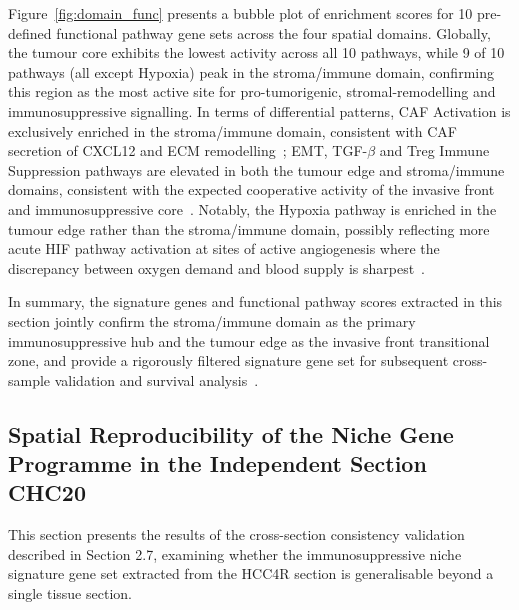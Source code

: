 \documentclass[12pt, a4paper]{article}
\begin{document}
Figure~\ref{fig:domain_func} presents a bubble plot of enrichment scores for 10 pre-defined functional pathway gene sets across the four spatial domains. Globally, the tumour core exhibits the lowest activity across all 10 pathways, while 9 of 10 pathways (all except Hypoxia) peak in the stroma/immune domain, confirming this region as the most active site for pro-tumorigenic, stromal-remodelling and immunosuppressive signalling. In terms of differential patterns, CAF Activation is exclusively enriched in the stroma/immune domain, consistent with CAF secretion of CXCL12 and ECM remodelling~\citep{kalluri2016biology}; EMT, TGF-$\beta$ and Treg Immune Suppression pathways are elevated in both the tumour edge and stroma/immune domains, consistent with the expected cooperative activity of the invasive front and immunosuppressive core~\citep{nieto2016emt,sakaguchi2020regulatory}. Notably, the Hypoxia pathway is enriched in the tumour edge rather than the stroma/immune domain, possibly reflecting more acute HIF pathway activation at sites of active angiogenesis where the discrepancy between oxygen demand and blood supply is sharpest~\citep{palazon2017hif}.

In summary, the signature genes and functional pathway scores extracted in this section jointly confirm the stroma/immune domain as the primary immunosuppressive hub and the tumour edge as the invasive front transitional zone, and provide a rigorously filtered signature gene set for subsequent cross-sample validation and survival analysis~\citep{zheng2017landscape,schurch2020coordinated}.

\subsection{Spatial Reproducibility of the Niche Gene Programme in the Independent Section CHC20}

This section presents the results of the cross-section consistency validation described in Section 2.7, examining whether the immunosuppressive niche signature gene set extracted from the HCC4R section is generalisable beyond a single tissue section.
\end{document}
